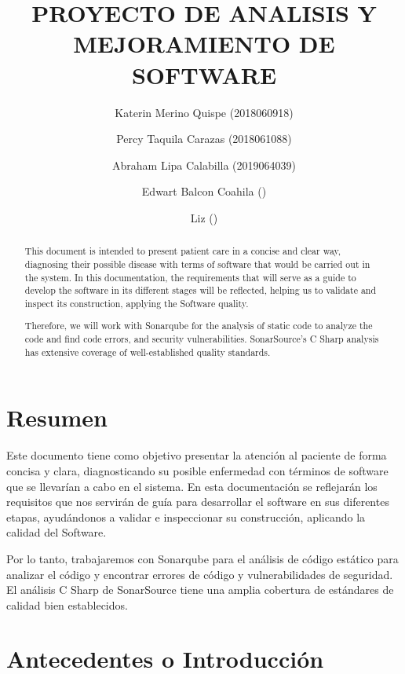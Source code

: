 \documentclass[preprint,12pt,notitlepage]{elsarticle}
\begin{document}
	
	\begin{frontmatter}

		\title{\huge  PROYECTO DE  ANALISIS Y  MEJORAMIENTO DE  SOFTWARE }
		\author{Katerin Merino Quispe  (2018060918)}
		\author{Percy Taquila Carazas  (2018061088)}
		\author{Abraham Lipa Calabilla (2019064039)}
		\author{Edwart Balcon Coahila             ()}
		\author{Liz                ()}
		\address{Tacna, Perú}
		
\begin{abstract}
This document is intended to present patient care in a concise and clear way, diagnosing their possible disease with terms of software that would be carried out in the system. In this documentation, the requirements that will serve as a guide to develop the software in its different stages will be reflected, helping us to validate and inspect its construction, applying the Software quality.

Therefore, we will work with Sonarqube for the analysis of static code to analyze the code and find code errors, and security vulnerabilities. SonarSource's C Sharp analysis has extensive coverage of well-established quality standards.  
\end{abstract}

\end{frontmatter}

\section*{Resumen}

Este documento tiene como objetivo presentar la atención al paciente de forma concisa y clara, diagnosticando su posible enfermedad con términos de software que se llevarían a cabo en el sistema. En esta documentación se reflejarán los requisitos que nos servirán de guía para desarrollar el software en sus diferentes etapas, ayudándonos a validar e inspeccionar su construcción, aplicando la calidad del Software.

Por lo tanto, trabajaremos con Sonarqube para el análisis de código estático para analizar el código y encontrar errores de código y vulnerabilidades de seguridad. El análisis C Sharp de SonarSource tiene una amplia cobertura de estándares de calidad bien establecidos.

\section{Antecedentes o Introducción}
\end{document}
